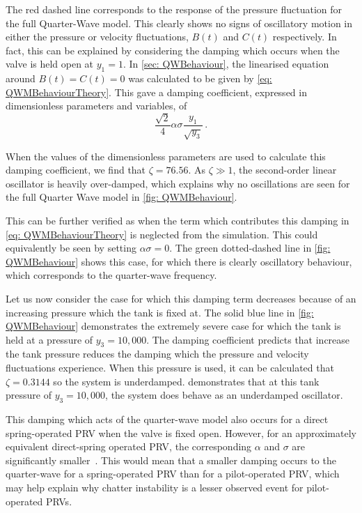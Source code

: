 The red dashed line corresponds to the response of the pressure fluctuation for the full Quarter-Wave model. This clearly shows no signs of oscillatory motion in either the pressure or velocity fluctuations, $B(t)$ and $C(t)$ respectively. In fact, this can be explained by considering the damping which occurs when the valve is held open at $y_1 = 1$. In \cref{sec: QWBehaviour}, the linearised equation around $B(t) = C(t) = 0$ was calculated to be given by \cref{eq: QWMBehaviourTheory}. This gave a damping coefficient, expressed in dimensionless parameters and variables, of
~
\begin{equation*}
    \frac{\sqrt{2}}{4} \alpha \sigma \frac{y_1}{\sqrt{y_3}} \, .
\end{equation*}

When the values of the dimensionless parameters are used to calculate this damping coefficient, we find that $\zeta = 76.56$. As $\zeta \gg 1$, the second-order linear oscillator is heavily over-damped, which explains why no oscillations are seen for the full Quarter Wave model in \cref{fig: QWMBehaviour}.

This can be further verified as when the term which contributes this damping in \cref{eq: QWMBehaviourTheory} is neglected from the simulation. This could equivalently be seen by setting $\alpha \sigma = 0$. The green dotted-dashed line in \cref{fig: QWMBehaviour} shows this case, for which there is clearly oscillatory behaviour, which corresponds to the quarter-wave frequency.

Let us now consider the case for which this damping term decreases because of an increasing pressure which the tank is fixed at. The solid blue line in \cref{fig: QWMBehaviour} demonstrates the extremely severe case for which the tank is held at a pressure of $y_3 = 10,000$. The damping coefficient predicts that increase the tank pressure reduces the damping which the pressure and velocity fluctuations experience. When this pressure is used, it can be calculated that $\zeta = 0.3144$ so the system is underdamped.  demonstrates that at this tank pressure of $y_3 = 10,000$, the system does behave as an underdamped oscillator.

This damping which acts of the quarter-wave model also occurs for a direct spring-operated PRV when the valve is fixed open. However, for an approximately equivalent direct-spring operated PRV, the corresponding $\alpha$ and $\sigma$ are significantly smaller~\cite{Hos2015DynamicModelling}. This would mean that a smaller damping occurs to the quarter-wave for a spring-operated PRV than for a pilot-operated PRV, which may help explain why chatter instability is a lesser observed event for pilot-operated PRVs.

